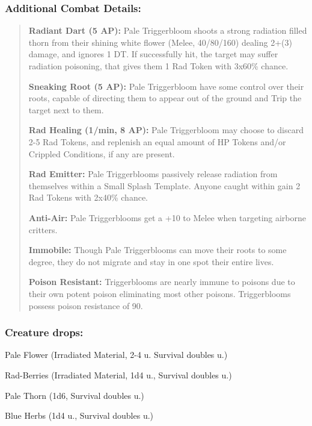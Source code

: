 \documentclass[11pt,a4paper,twocolumn]{book}
\begin{document}
	\subsubsection*{Additional Combat Details:}
	\begin{verse}
		\textbf{Radiant Dart (5 AP):} Pale Triggerbloom shoots a strong radiation filled thorn from their shining white flower (Melee, 40/80/160) dealing 2+(3) damage, and ignores 1 DT. If successfully hit, the target may suffer radiation poisoning, that gives them 1 Rad Token with 3x60\% chance.
		
		\textbf{Sneaking Root (5 AP):} Pale Triggerbloom have some control over their roots, capable of directing them to appear out of the ground and Trip the target next to them. 
		
		\textbf{Rad Healing (1/min, 8 AP):} Pale Triggerbloom may choose to discard 2-5 Rad Tokens, and replenish an equal amount of HP Tokens and/or Crippled Conditions, if any are present.
		
		\textbf{Rad Emitter:} Pale Triggerblooms passively release radiation from themselves within a Small Splash Template. Anyone caught within gain 2 Rad Tokens with 2x40\% chance.
		
		\textbf{Anti-Air:} Pale Triggerblooms get a +10 to Melee when targeting airborne critters.
		
		\textbf{Immobile:} Though Pale Triggerblooms can move their roots to some degree, they do not migrate and stay in one spot their entire lives.
		
		\textbf{Poison Resistant:} Triggerblooms are nearly immune to poisons due to their own potent poison eliminating most other poisons. Triggerblooms possess poison resistance of 90.
	\end{verse}
	
	\subsubsection*{Creature drops:}
	\begin{compactitem}
		\item Pale Flower (Irradiated Material, 2-4 u. Survival doubles u.)
		\item Rad-Berries (Irradiated Material, 1d4 u., Survival doubles u.)
		\item Pale Thorn (1d6, Survival doubles u.)
		\item Blue Herbs (1d4 u., Survival doubles u.)
	\end{compactitem}
	
\end{document}
